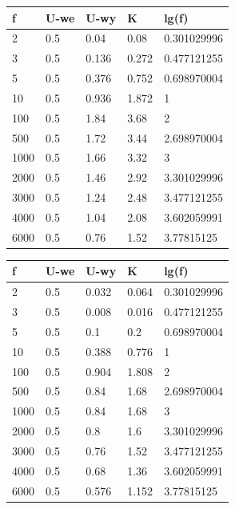 \documentclass[11pt]{article}
\begin{document}
\begin{figure}[!ht]
\centering

\begin{minipage}[t]{0.48\textwidth}
\centering
{}
\begin{tabular}{|l|l|l|l|l|}
\hline
    f & U-we & U-wy & K & lg(f) \\ \hline
    2 & 0.5 & 0.04 & 0.08 & 0.301029996 \\ \hline
    3 & 0.5 & 0.136 & 0.272 & 0.477121255 \\ \hline
    5 & 0.5 & 0.376 & 0.752 & 0.698970004 \\ \hline
    10 & 0.5 & 0.936 & 1.872 & 1 \\ \hline
    100 & 0.5 & 1.84 & 3.68 & 2 \\ \hline
    500 & 0.5 & 1.72 & 3.44 & 2.698970004 \\ \hline
    1000 & 0.5 & 1.66 & 3.32 & 3 \\ \hline
    2000 & 0.5 & 1.46 & 2.92 & 3.301029996 \\ \hline
    3000 & 0.5 & 1.24 & 2.48 & 3.477121255 \\ \hline
    4000 & 0.5 & 1.04 & 2.08 & 3.602059991 \\ \hline       
    6000 & 0.5 & 0.76 & 1.52 & 3.77815125 \\ \hline
\end{tabular}
\end{minipage}
\hfill
\begin{minipage}[t]{0.48\textwidth}
\centering
{}
\begin{tabular}{|l|l|l|l|l|}
\hline
    f & U-we & U-wy & K & lg(f) \\ \hline
    2 & 0.5 & 0.032 & 0.064 & 0.301029996 \\ \hline
    3 & 0.5 & 0.008 & 0.016 & 0.477121255 \\ \hline
    5 & 0.5 & 0.1 & 0.2 & 0.698970004 \\ \hline
    10 & 0.5 & 0.388 & 0.776 & 1 \\ \hline
    100 & 0.5 & 0.904 & 1.808 & 2 \\ \hline
    500 & 0.5 & 0.84 & 1.68 & 2.698970004 \\ \hline
    1000 & 0.5 & 0.84 & 1.68 & 3 \\ \hline
    2000 & 0.5 & 0.8 & 1.6 & 3.301029996 \\ \hline
    3000 & 0.5 & 0.76 & 1.52 & 3.477121255 \\ \hline
    4000 & 0.5 & 0.68 & 1.36 & 3.602059991 \\ \hline
    6000 & 0.5 & 0.576 & 1.152 & 3.77815125 \\ \hline
\end{tabular}
\end{minipage}


\end{figure}
\end{document}

